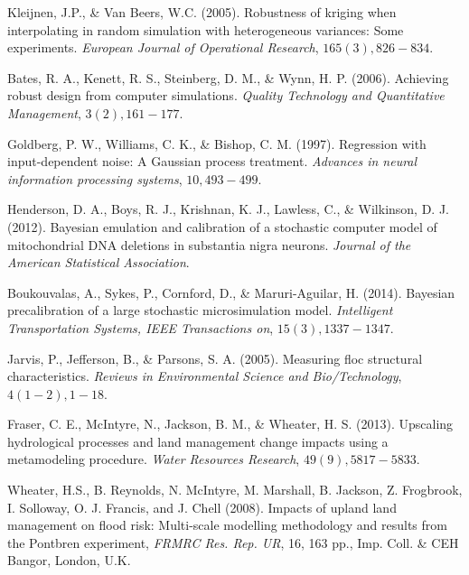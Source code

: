 \begin{thebibliography}{94}
 Kleijnen, J.P., \& Van Beers, W.C. (2005). Robustness of kriging when interpolating in random simulation with heterogeneous variances: Some experiments. {\it European Journal of Operational Research}, $165(3), 826-834$.

 Bates, R. A., Kenett, R. S., Steinberg, D. M., \& Wynn, H. P. (2006). Achieving robust design from computer simulations. {\it Quality Technology and Quantitative Management}, $3(2), 161-177$.

 Goldberg, P. W., Williams, C. K., \& Bishop, C. M. (1997). Regression with input-dependent noise: A Gaussian process treatment. {\it Advances in neural information processing systems}, $10, 493-499$.

 Henderson, D. A., Boys, R. J., Krishnan, K. J., Lawless, C., \& Wilkinson, D. J. (2012). Bayesian emulation and calibration of a stochastic computer model of mitochondrial DNA deletions in substantia nigra neurons. {\it Journal of the American Statistical Association}.

 Boukouvalas, A., Sykes, P., Cornford, D., \& Maruri-Aguilar, H. (2014). Bayesian precalibration of a large stochastic microsimulation model. {\it Intelligent Transportation Systems, IEEE Transactions on}, $15(3), 1337-1347$.


 Jarvis, P., Jefferson, B., \& Parsons, S. A. (2005). Measuring floc structural characteristics. {\it Reviews in Environmental Science and Bio/Technology}, $4(1-2), 1-18$.

  Fraser, C. E., McIntyre, N., Jackson, B. M., \& Wheater, H. S. (2013). Upscaling hydrological processes and land management change impacts using a metamodeling procedure. {\it Water Resources Research}, $49(9), 5817-5833$.

  Wheater, H.S., B. Reynolds, N. McIntyre, M. Marshall, B. Jackson, Z. Frogbrook, I. Solloway, O. J. Francis, and J. Chell (2008). Impacts of upland land management on flood risk: Multi-scale modelling methodology and results from the Pontbren experiment, {\it FRMRC Res. Rep. UR}, 16, 163 pp., Imp. Coll. \& CEH Bangor, London, U.K.


\end{thebibliography}
